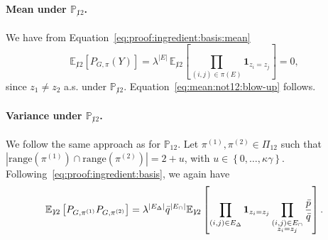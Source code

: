 \documentclass[final]{colt2026}
\newcommand{\1}{\mathbf{1}}
\newcommand{\bbE}{\mathbb{E}}
\newcommand{\bbP}{\mathbb{P}}
\newcommand{\ac}[1]{\left\{#1\right\}}
\newcommand{\cro}[1]{\left[#1\right]}
\begin{document}
\paragraph{Mean under $\bbP_{\not 12}$.}
We have from Equation~\eqref{eq:proof:ingredient:basis:mean}
\begin{equation*}
\bbE_{\not 12}\cro{P_{G,\pi}(Y)}= \lambda^{|E|} \,\bbE_{\not 12}\cro{\prod_{(i,j)\in \pi(E)}\mathbf 1_{z_{i}=z_{j}}}=0,
\end{equation*}
since $z_{1}\neq z_{2}$ a.s. under  $\bbP_{\not 12}$. Equation~\eqref{eq:mean:not12:blow-up} follows.



\paragraph{Variance under $\bbP_{\not 12}$.}
We follow the same approach as for  $\bbP_{12}$. 
Let $\pi^{(1)},\pi^{(2)}\in \Pi_{12}$ such that $|\text{range}(\pi^{(1)})\cap \text{range}(\pi^{(2)})|=2+u$, with $u\in \ac{0,\ldots,\kappa \gamma}$. Following~\eqref{eq:proof:ingredient:basis}, we again have 
$$\bbE_{\not 12}\cro{P_{G,\pi^{(1)}}P_{G,\pi^{(2)}}}=\lambda^{|E_{\Delta}|} \bar q^{|E_{\cap}|} \bbE_{\not 12}\cro{\prod_{(i,j)\in E_{\Delta}}\mathbf 1_{z_{i}=z_{j}}\prod_{\substack{(i,j)\in E_{\cap}\\ z_{i}=z_{j}}}{\bar p\over \bar q}}.$$
\smallskip
\end{document}
